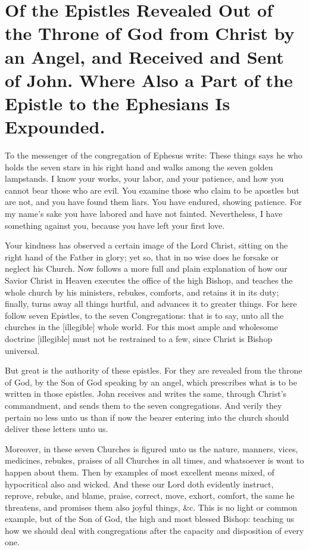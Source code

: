 \chapter[Sermon 7. Of the Epistles Revealed Out of the Throne of God from Christ by an Angel, and Received and Sent of John. Where Also a Part of the Epistle to the Ephesians Is Expounded.]{Of the Epistles Revealed Out of the Throne of God from Christ by an Angel, and Received and Sent of John. Where Also a Part of the Epistle to the Ephesians Is Expounded.}
\label{sermon:007}

To the messenger of the congregation of Ephesus write: These things says he who holds the seven stars in his right hand and walks among the seven golden lampstands. I know your works, your labor, and your patience, and how you cannot bear those who are evil. You examine those who claim to be apostles but are not, and you have found them liars. You have endured, showing patience. For my name’s sake you have labored and have not fainted. Nevertheless, I have something against you, because you have left your first love.

Your kindness has observed a certain image of the Lord Christ, sitting on the right hand of the Father in glory; yet so, that in no wise does he forsake or neglect his Church. Now follows a more full and plain explanation of how our Savior Christ in Heaven executes the office of the high Bishop, and teaches the whole church by his ministers, rebukes, comforts, and retains it in its duty; finally, turns away all things hurtful, and advances it to greater things. For here follow seven Epistles, to the seven Congregations: that is to say, unto all the churches in the [illegible] whole world. For this most ample and wholesome doctrine [illegible] must not be restrained to a few, since Christ is Bishop universal.

But great is the authority of these epistles. For they are revealed from the throne of God, by the Son of God speaking by an angel, which prescribes what is to be written in those epistles. John receives and writes the same, through Christ’s commandment, and sends them to the seven congregations. And verily they pertain no less unto us than if now the bearer entering into the church should deliver these letters unto us.

Moreover, in these seven Churches is figured unto us the nature, manners, vices, medicines, rebukes, praises of all Churches in all times, and whatsoever is wont to happen about them. Then by examples of most excellent means mixed, of hypocritical also and wicked. And these our Lord doth evidently instruct, reprove, rebuke, and blame, praise, correct, move, exhort, comfort, the same he threatens, and promises them also joyful things, \&c. This is no light or common example, but of the Son of God, the high and most blessed Bishop: teaching us how we should deal with congregations after the capacity and disposition of every one.

